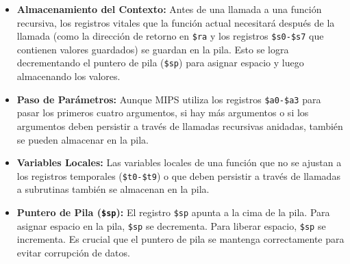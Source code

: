 \documentclass{article}
\begin{document}
\begin{itemize}
    \item \textbf{Almacenamiento del Contexto:} Antes de una llamada a una función recursiva, los registros vitales que la función actual necesitará después de la llamada (como la dirección de retorno en \texttt{\$ra} y los registros \texttt{\$s0-\$s7} que contienen valores guardados) se guardan en la pila. Esto se logra decrementando el puntero de pila (\texttt{\$sp}) para asignar espacio y luego almacenando los valores.
    \item \textbf{Paso de Parámetros:} Aunque MIPS utiliza los registros \texttt{\$a0-\$a3} para pasar los primeros cuatro argumentos, si hay más argumentos o si los argumentos deben persistir a través de llamadas recursivas anidadas, también se pueden almacenar en la pila.
    \item \textbf{Variables Locales:} Las variables locales de una función que no se ajustan a los registros temporales (\texttt{\$t0-\$t9}) o que deben persistir a través de llamadas a subrutinas también se almacenan en la pila.
    \item \textbf{Puntero de Pila (\texttt{\$sp}):} El registro \texttt{\$sp} apunta a la cima de la pila. Para asignar espacio en la pila, \texttt{\$sp} se decrementa. Para liberar espacio, \texttt{\$sp} se incrementa. Es crucial que el puntero de pila se mantenga correctamente para evitar corrupción de datos.
\end{itemize}
\end{document}
